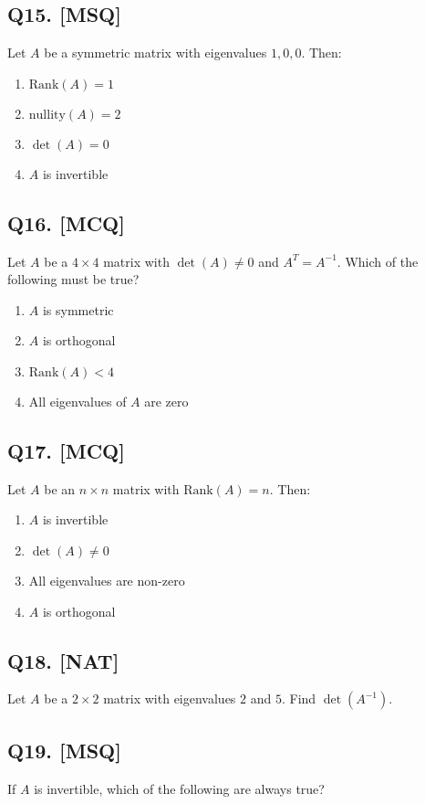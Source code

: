 \subsection*{Q15. [MSQ]}
Let $A$ be a symmetric matrix with eigenvalues $1, 0, 0$. Then:

\begin{enumerate}[label=(\alph*)]
    \item $\text{Rank}(A) = 1$
    \item $\text{nullity}(A) = 2$
    \item $\det(A) = 0$ 
    \item $A$ is invertible
\end{enumerate}

\subsection*{Q16. [MCQ]}
Let $A$ be a $4 \times 4$ matrix with $\det(A) \neq 0$ and $A^T = A^{-1}$. Which of the following must be true?

\begin{enumerate}[label=(\alph*)]
    \item $A$ is symmetric
    \item $A$ is orthogonal
    \item $\text{Rank}(A) < 4$
    \item All eigenvalues of $A$ are zero
\end{enumerate}

\subsection*{Q17. [MCQ]}
Let $A$ be an $n \times n$ matrix with $\text{Rank}(A) = n$. Then:

\begin{enumerate}[label=(\alph*)]
    \item $A$ is invertible
    \item $\det(A) \neq 0$
    \item All eigenvalues are non-zero
    \item $A$ is orthogonal
\end{enumerate}

\subsection*{Q18. [NAT]}
Let $A$ be a $2 \times 2$ matrix with eigenvalues $2$ and $5$. Find $\det(A^{-1})$.

\subsection*{Q19. [MSQ]}
If $A$ is invertible, which of the following are always true?

